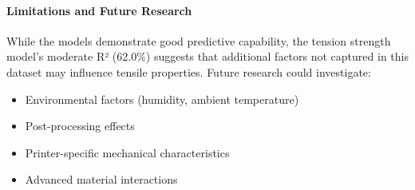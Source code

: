 \paragraph{Limitations and Future Research}
While the models demonstrate good predictive capability, the tension strength model's moderate R² (62.0\%) suggests that additional factors not captured in this dataset may influence tensile properties. Future research could investigate:
\begin{itemize}
    \item Environmental factors (humidity, ambient temperature)
    \item Post-processing effects
    \item Printer-specific mechanical characteristics
    \item Advanced material interactions
\end{itemize}